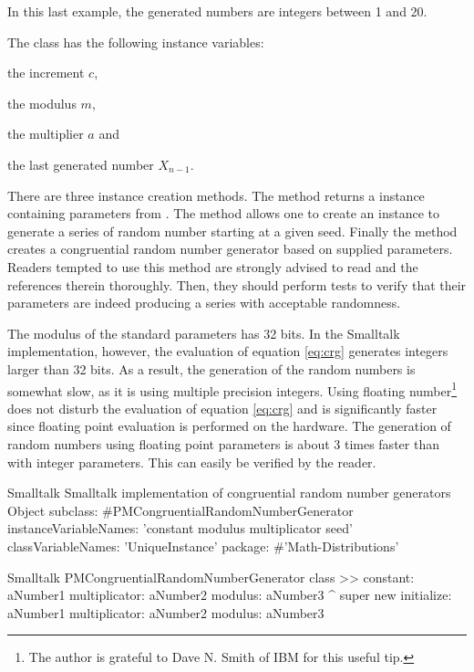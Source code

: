 In this last example, the generated numbers are integers between 1 and 20.

 The class  has the following instance variables:
\begin{description}
  \item {} the increment $c$,
  \item {} the modulus $m$,
  \item {} the multiplier $a$ and
  \item {} the last generated number $X_{n-1}$.
\end{description}
There are three instance creation methods. The method  returns a  instance containing parameters from \cite{Knuth2}.
The method  allows one to create an instance to generate a series of random number starting at a given seed.
Finally the method  creates a congruential random number generator based on supplied parameters.
Readers tempted to use this method are strongly advised to read \cite{Knuth2} and the references therein
thoroughly.
Then, they should perform tests to verify that their parameters are indeed producing a series with acceptable randomness.

The modulus of the standard parameters has 32 bits. In the
Smalltalk implementation, however, the evaluation of equation
\ref{eq:crg} generates integers larger than 32 bits. As a result,
the generation of the random numbers is somewhat slow, as it is
using multiple precision integers. Using floating
number\footnote{The author is grateful to Dave N. Smith of IBM for
this useful tip.} does not disturb the evaluation of equation
\ref{eq:crg} and is significantly faster since floating point
evaluation is performed on the hardware. The generation of random
numbers using floating point parameters is about 3 times faster
than with integer parameters. This can easily be verified by the
reader.

\begin{listing}[label=lst:randomcong]{Smalltalk}
  {Smalltalk implementation of congruential random number generators}
Object subclass: #PMCongruentialRandomNumberGenerator
    instanceVariableNames: 'constant modulus multiplicator seed'
    classVariableNames: 'UniqueInstance'
    package: #'Math-Distributions'
\end{listing}

\begin{displaycode}{Smalltalk}
PMCongruentialRandomNumberGenerator class >> constant: aNumber1 multiplicator: aNumber2 modulus: aNumber3
    ^ super new 
        initialize: aNumber1
        multiplicator: aNumber2
        modulus: aNumber3
\end{displaycode}


